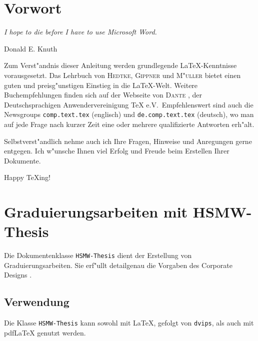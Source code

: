 \documentclass[parskip,bibtotocnumbered]{scrreprt}
\author{Prof.\ K.\  Dohmen}
\title{\Huge \scalebox{1.2}{\LaTeX-Vorlagen}}
\date{}
\begin{document}
 

\maketitle

\chapter*{Vorwort}

\epigraph{\em I hope to die before I have to use Microsoft Word.}{Donald E. Knuth}

Zum Verst"andnis dieser Anleitung werden grundlegende \LaTeX{}-Kenntnisse
vorausgesetzt.  Das Lehrbuch von \textsc{Hedtke}, \textsc{Gippner} und
\textsc{M"uller} \cite{Hedtke:2009} bietet einen guten und preisg"unstigen
Einstieg in die \LaTeX{}-Welt.  Weitere Buchempfehlungen finden sich auf der
Webseite von \textsc{Dante} \cite{Dante:2009}, der Deutschsprachigen
Anwendervereinigung \TeX{} e.V.\, Empfehlenswert sind auch die Newsgroups
\texttt{comp.text.tex} (englisch) und \texttt{de.comp.text.tex} (deutsch), wo
man auf jede Frage nach kurzer Zeit eine oder mehrere qualifizierte Antworten
erh"alt.

Selbstverst"andlich nehme auch ich Ihre Fragen, Hinweise und Anregungen gerne
entgegen.  Ich w"unsche Ihnen viel Erfolg und Freude beim Erstellen Ihrer
Dokumente.

Happy \TeX{}ing!

\newcommand*\backupvskip{}
\let\backupvskip\chapterheadstartvskip
\renewcommand*\chapterheadstartvskip{\vspace{-\baselineskip}}
\tableofcontents
\let\chapterheadstartvskip\backupvskip


\chapter{Graduierungsarbeiten mit HSMW-Thesis}
\label{grad}


Die Dokumentenklasse \texttt{HSMW-Thesis} dient der Erstellung von
Graduierungsarbeiten.  Sie erf"ullt detailgenau die Vorgaben des Corporate
Designs \cite{cdmanual}.

\section{Verwendung}
\label{verwendung}

Die Klasse \verb!HSMW-Thesis! kann sowohl mit \LaTeX{}, gefolgt von
\texttt{dvips}, als auch mit pdf\LaTeX{} genutzt werden.
\end{document}
